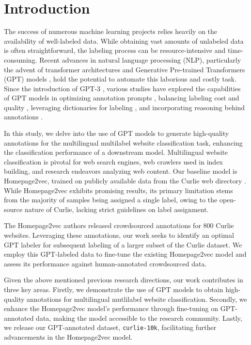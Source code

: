 \section{Introduction}
The success of numerous machine learning projects relies heavily on the availability of well-labeled data. While obtaining vast amounts of unlabeled data is often straightforward, the labeling process can be resource-intensive and time-consuming. Recent advances in natural language processing (NLP), particularly the advent of transformer architectures \cite{transformers} and Generative Pre-trained Transformers (GPT) models \cite{gpt3, gpt4}, hold the potential to automate this laborious and costly task. Since the introduction of GPT-3 \cite{gpt3}, various studies have explored the capabilities of GPT models in optimizing annotation prompts \cite{prompt-tuning}, balancing labeling cost and quality \cite{reduce-labeling-cost}, leveraging dictionaries for labeling \cite{is-gpt3-good-annot}, and incorporating reasoning behind annotations \cite{annollm}.

In this study, we delve into the use of GPT models to generate high-quality annotations for the multilingual multilabel website classification task, enhancing the classification performance of a downstream model. Multilingual website classification is pivotal for web search engines, web crawlers used in index building, and research endeavors analyzing web content. Our baseline model is Homepage2vec, trained on publicly available data from the Curlie web directory \cite{homepage2vec}. While Homepage2vec exhibits promising results, its primary limitation stems from the majority of samples being assigned a single label, owing to the open-source nature of Curlie, lacking strict guidelines on label assignment.

The Homepage2vec authors released crowdsourced annotations for 800 Curlie websites. Leveraging these annotations, our work seeks to identify an optimal GPT labeler for subsequent labeling of a larger subset of the Curlie dataset. We employ this GPT-labeled data to fine-tune the existing Homepage2vec model and assess its performance against human-annotated crowdsourced data.

Given the above mentioned previous research directions, our work contributes in three key areas. Firstly, we demonstrate the use of GPT models to obtain high-quality annotations for multilingual mutlilabel website classification. Secondly, we enhance the Homepage2vec model's performance through fine-tuning on GPT-annotated data, making the model accessible to the research community. Lastly, we release our GPT-annotated dataset, \texttt{curlie-10k}, facilitating further advancements in the Homepage2vec model.
